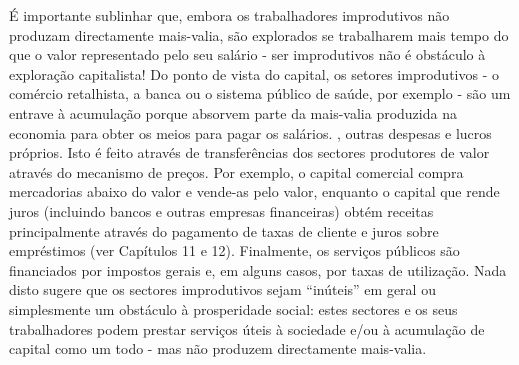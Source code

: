 É importante sublinhar que, embora os trabalhadores improdutivos não produzam directamente mais-valia, são explorados se trabalharem mais tempo do que o valor representado pelo seu salário - ser improdutivos não é obstáculo à exploração capitalista! Do ponto de vista do capital, os setores improdutivos - o comércio retalhista, a banca ou o sistema público de saúde, por exemplo - são um entrave à acumulação porque absorvem parte da mais-valia produzida na economia para obter os meios para pagar os salários. , outras despesas e lucros próprios. Isto é feito através de transferências dos sectores produtores de valor através do mecanismo de preços. Por exemplo, o capital comercial compra mercadorias abaixo do valor e vende-as pelo valor, enquanto o capital que rende juros (incluindo bancos e outras empresas financeiras) obtém receitas principalmente através do pagamento de taxas de cliente e juros sobre empréstimos (ver Capítulos {\color{blue}11} e {\color{blue}12}). Finalmente, os serviços públicos são financiados por impostos gerais e, em alguns casos, por taxas de utilização. Nada disto sugere que os sectores improdutivos sejam “inúteis” em geral ou simplesmente um obstáculo à prosperidade social: estes sectores e os seus trabalhadores podem prestar serviços úteis à sociedade e/ou à acumulação de capital como um todo - mas não produzem directamente mais-valia.
 \par 
